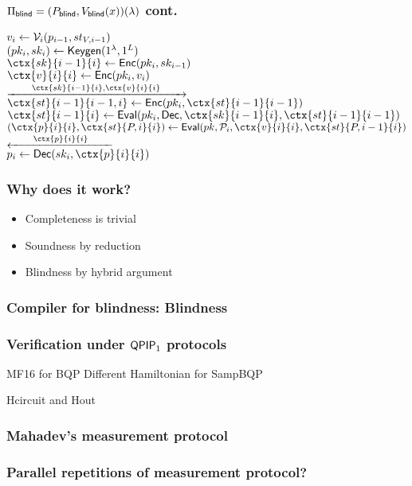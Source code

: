 \documentclass{beamer}
\begin{document}
\begin{frame}
	\frametitle{$\Pi_{\mathsf{blind}}=(P_{\mathsf{blind}}, V_{\mathsf{blind}}(x))(\lambda)$ cont.}
	$v_i\leftarrow\mathcal{V}_i(p_{i-1}, st_{V, i-1})$
	\pause
	\\$(pk_i, sk_i)\leftarrow\mathsf{Keygen}(1^\lambda, 1^L)$
	\pause
	\\$\ctx{sk}{i-1}{i}\leftarrow\Enc(pk_i, sk_{i-1})$
	\pause
	\\$\ctx{v}{i}{i}\leftarrow\Enc(pk_i, v_i)$
	\pause
	\\\hspace*{\fill}$\xrightarrow{\qquad \ctx{sk}{i-1}{i}, \ctx{v}{i}{i}\qquad}$\hspace*{\fill}
	\pause
	\\\hspace*{\fill}$\ctx{st}{i-1}{i-1, i}\leftarrow\Enc(pk_i, \ctx{st}{i-1}{i-1})$
	\pause
	\\\hspace*{\fill}$\ctx{st}{i-1}{i}\leftarrow\Eval(pk_i, \Dec, \ctx{sk}{i-1}{i}, \ctx{st}{i-1}{i-1})$
	\pause
	\\\hspace*{\fill}$(\ctx{p}{i}{i}, \ctx{st}{P, i}{i})\leftarrow\Eval(pk, \cP_i, \ctx{v}{i}{i}, \ctx{st}{P, i-1}{i})$
	\pause
	\\\hspace*{\fill}$\xleftarrow{\qquad \ctx{p}{i}{i}\qquad}$\hspace*{\fill}
	\pause
	\\$p_i\leftarrow\Dec(sk_i, \ctx{p}{i}{i})$
\end{frame}

\begin{frame}
	\frametitle{Why does it work?}
	\begin{itemize}[<+->]
		\item Completeness is trivial
		\item Soundness by reduction
		\item Blindness by hybrid argument
	\end{itemize}
\end{frame}

\begin{frame}
	\frametitle{Compiler for blindness: Blindness}

\end{frame}

\begin{frame}
	\frametitle{Verification under $\operatorname{\mathsf{QPIP}}_1$ protocols}
	MF16 for BQP
	Different Hamiltonian for SampBQP

	Hcircuit and Hout
\end{frame}

\begin{frame}
	\frametitle{Mahadev's measurement protocol}

\end{frame}

\begin{frame}
	\frametitle{Parallel repetitions of measurement protocol?}

\end{frame}
\end{document}
